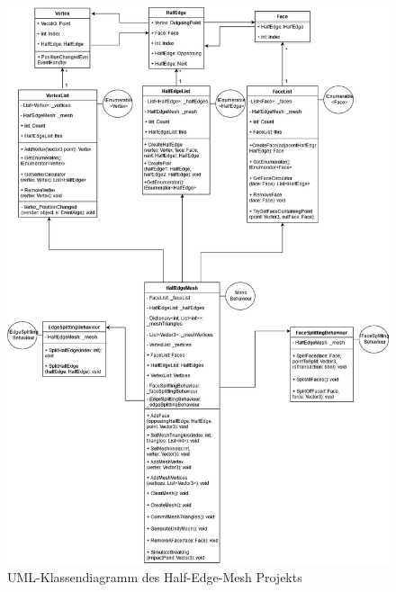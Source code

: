 \begin{figure}[t]
	\centering
	\includegraphics[width=0.7\linewidth]{Images/ClassDiagramHalfEdgeMesh}
	\caption[HalfEdgeMeshUMLDiagramm]{UML-Klassendiagramm des Half-Edge-Mesh Projekts}
	\label{fig:classdiagramhalfedgemesh}
\end{figure}


